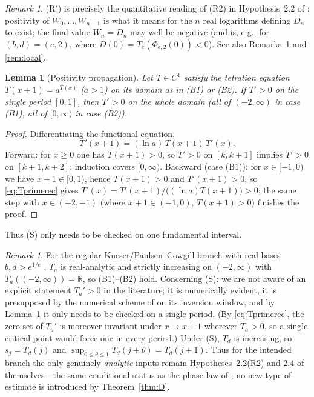 \documentclass[11pt]{article}
\newtheorem{lemma}[theorem]{Lemma}
\theoremstyle{definition}
\theoremstyle{remark}
\newtheorem{remark}[theorem]{Remark}
\newcommand{\R}{\mathbb{R}}
\newcommand{\Td}{T_{d}}
\begin{document}
\begin{remark}\label{rem:hyps}
(R$'$) is precisely the quantitative reading of (R2) in Hypothesis~2.2 of
\cite{J}: positivity of $W_0,\dots,W_{n-1}$ is what it means for the $n$
real logarithms defining $D_n$ to exist; the final value $W_n=D_n$ may
well be negative (and is, e.g., for $(b,d)=(e,2)$, where
$D(0)=T_e(\Phi_{e,2}(0))<0$). See also Remarks~\ref{rem:regular} and
\ref{rem:local}.
\end{remark}

\begin{lemma}[Positivity propagation]\label{lem:positivity}
Let $T\in C^{1}$ satisfy the tetration equation $T(x+1)=a^{T(x)}$
\textup{(}$a>1$\textup{)} on its domain as in \textup{(B1)} or
\textup{(B2)}. If $T'>0$ on the single period $[0,1]$, then $T'>0$ on the
whole domain \textup{(}all of $(-2,\infty)$ in case \textup{(B1)}, all of
$[0,\infty)$ in case \textup{(B2)}\textup{)}.
\end{lemma}

\begin{proof}
Differentiating the functional equation,
\begin{equation}\label{eq:Tprimerec}
T'(x+1)=(\ln a)\,T(x+1)\,T'(x).
\end{equation}
Forward: for $x\ge0$ one has $T(x+1)>0$, so $T'>0$ on $[k,k+1]$ implies
$T'>0$ on $[k+1,k+2]$; induction covers $[0,\infty)$. Backward (case
(B1)): for $x\in[-1,0)$ we have $x+1\in[0,1)$, hence $T(x+1)>0$ and
$T'(x+1)>0$, so \eqref{eq:Tprimerec} gives
$T'(x)=T'(x+1)/\big((\ln a)T(x+1)\big)>0$; the same step with
$x\in(-2,-1)$ (where $x+1\in(-1,0)$, $T(x+1)>0$) finishes the proof.
\end{proof}

Thus (S) only needs to be checked on one fundamental interval.

\begin{remark}\label{rem:regular}
For the regular Kneser/Paulsen--Cowgill branch with real bases
$b,d>e^{1/e}$ \cite{Kneser,PC,Paulsen}, $T_a$ is real-analytic and
strictly increasing on $(-2,\infty)$ with $T_a((-2,\infty))=\R$, so
(B1)--(B2) hold. Concerning (S): we are not aware of an explicit
statement $T_a'>0$ in the literature; it is numerically evident, it is
presupposed by the numerical scheme of \cite[App.~A]{J} on its inversion
window, and by Lemma~\ref{lem:positivity} it only needs to be checked on
a single period. (By \eqref{eq:Tprimerec}, the zero set of $T_a'$ is
moreover invariant under $x\mapsto x+1$ wherever $T_a>0$, so a single
critical point would force one in every period.) Under (S), $\Td$ is
increasing, so $s_j=\Td(j)$ and
$\sup_{0\le\theta\le1}\Td(j+\theta)=\Td(j+1)$. Thus for the intended
branch the only genuinely \emph{analytic} inputs remain
Hypotheses~2.2(R2) and 2.4 of \cite{J} themselves---the same conditional
status as the phase law of \cite{J}; no new type of estimate is
introduced by Theorem~\ref{thm:D}.
\end{remark}
\end{document}
